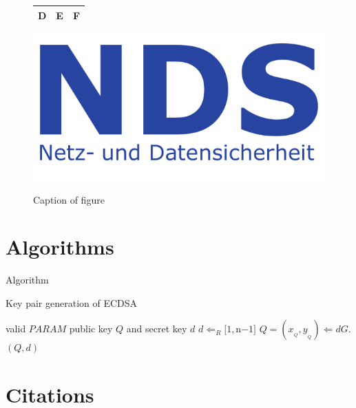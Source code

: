 \begin{figure}[htb]
  \centering
  \begin{minipage}[b]{0.45\textwidth}\center
  \begin{tabular}{|c|c|c|}\hline
  D & E & F\\\hline
  \end{tabular}
  \label{tbl:3}
  \end{minipage}\hspace{0.05\textwidth}
  \begin{minipage}[b]{0.45\textwidth}\center
  {\includegraphics [width=1.0\textwidth]{images/NDS_Logo_HKS_42.pdf}}
  \caption{Caption of figure}
  \label{fig:6}
  \end{minipage}
\end{figure}

\newpage
\section{Algorithms}
\label{section:1.3}

Algorithm

\begin{algorithm}
\caption{Key pair generation of ECDSA}
\label{algo-crypto-6}

\begin{algorithmic}
\REQUIRE valid $PARAM$
\ENSURE public key $Q$ and secret key $d$
\WHILE{\TRUE}
\STATE $d \Leftarrow_R [1, $n$-1]$
\STATE $Q = (x_{_Q}, y_{_Q}) \Leftarrow dG$.
\RETURN $(Q, d)$
\ENDIF
\ENDWHILE
\end{algorithmic}
\end{algorithm}

\section{Citations}
\label{section:1.4}

